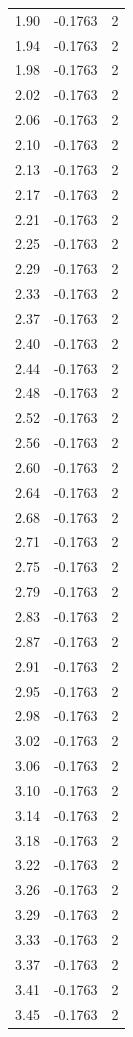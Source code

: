 \begin{longtable}{lrr}
  1.90 & -0.1763 & 2 \\
  1.94 & -0.1763 & 2 \\
  1.98 & -0.1763 & 2 \\
  2.02 & -0.1763 & 2 \\
  2.06 & -0.1763 & 2 \\
  2.10 & -0.1763 & 2 \\
  2.13 & -0.1763 & 2 \\
  2.17 & -0.1763 & 2 \\
  2.21 & -0.1763 & 2 \\
  2.25 & -0.1763 & 2 \\
  2.29 & -0.1763 & 2 \\
  2.33 & -0.1763 & 2 \\
  2.37 & -0.1763 & 2 \\
  2.40 & -0.1763 & 2 \\
  2.44 & -0.1763 & 2 \\
  2.48 & -0.1763 & 2 \\
  2.52 & -0.1763 & 2 \\
  2.56 & -0.1763 & 2 \\
  2.60 & -0.1763 & 2 \\
  2.64 & -0.1763 & 2 \\
  2.68 & -0.1763 & 2 \\
  2.71 & -0.1763 & 2 \\
  2.75 & -0.1763 & 2 \\
  2.79 & -0.1763 & 2 \\
  2.83 & -0.1763 & 2 \\
  2.87 & -0.1763 & 2 \\
  2.91 & -0.1763 & 2 \\
  2.95 & -0.1763 & 2 \\
  2.98 & -0.1763 & 2 \\
  3.02 & -0.1763 & 2 \\
  3.06 & -0.1763 & 2 \\
  3.10 & -0.1763 & 2 \\
  3.14 & -0.1763 & 2 \\
  3.18 & -0.1763 & 2 \\
  3.22 & -0.1763 & 2 \\
  3.26 & -0.1763 & 2 \\
  3.29 & -0.1763 & 2 \\
  3.33 & -0.1763 & 2 \\
  3.37 & -0.1763 & 2 \\
  3.41 & -0.1763 & 2 \\
  3.45 & -0.1763 & 2 \\

\end{longtable}
